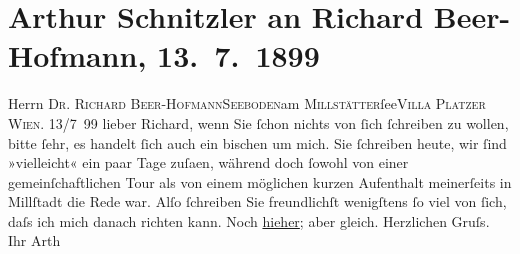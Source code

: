 

         
         \renewcommand{\erwaehntePersonen}{Personen: Richard Beer-Hofmann}
         \renewcommand{\erwaehnteOrte}{Orte: IX., Alsergrund, Millstatt, Millstätter See, Seeboden, Villa Platzer, Wien}
         \renewcommand{\erwaehnteWerke}{}
               \section[Arthur Schnitzler an Richard Beer-Hofmann, 13. 7. 1899]{ Arthur Schnitzler an Richard Beer-Hofmann,
               13. 7. 1899}\nopagebreak{}\rehead{ }\begin{ledgroupsized}[t]{13cm}\normalsize\beginnumbering \toendnotes[C]{\smallbreak\pagebreak[2]} 
\pstart{}{\pb}Herrn \textsc{Dr. Richard
                     Beer-Hofmann}\pend{}\pstart{}\textsc{Seeboden}\pend{}\pstart{}am \textsc{Millstätter}ſee\pend{}\pstart{}\textsc{Villa Platzer}\pend{}{\bigskip}\pstart
           \raggedleft{}{\pb}\textsc{Wien}. 13/7 99\pend
           \pstart
           lieber Richard, wenn Sie ſchon nichts von ſich ſchreiben zu wollen,
               bitte ſehr, es handelt ſich auch ein bischen um mich. Sie ſchreiben heute, wir ſind
               »vielleicht« ein paar Tage zuſa{\geminationm}en, während doch ſowohl
               von einer gemeinſchaftlichen Tour als von einem möglichen kurzen Aufenthalt
               meinerſeits in Millſtadt die Rede war. Alſo
               ſchreiben Sie freundlichſt wenigſtens ſo viel von ſich, daſs ich mich danach richten
               kann.\pend
           \pstart
           Noch \uline{hieher}; aber gleich.\pend
           \pstart Herzlichen Gruſs. Ihr \spacefill\mbox{Arth}\pend{}
         
         \endnumbering{}\end{ledgroupsized}  \newcommand{\dateiname}{L00939}\newcommand{\titel}{Arthur Schnitzler an Richard Beer-Hofmann, 13. 7. 1899}\newcommand{\editorInnen}{Martin Anton Müller und Gerd-Hermann Susen}
      